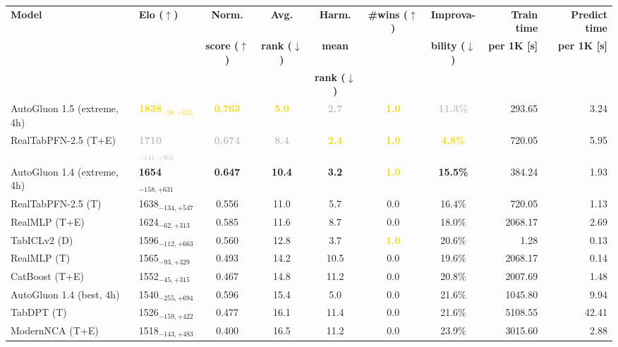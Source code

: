 \begin{tabular}{llcccccrr}
\toprule
\textbf{Model} & \textbf{Elo ($\uparrow$)} & \textbf{Norm.} & \textbf{Avg.} & \textbf{Harm.} & \textbf{\#wins ($\uparrow$)} & \textbf{Improva-} & \textbf{Train time} & \textbf{Predict time} \\
 &  & \textbf{score ($\uparrow$)} & \textbf{rank ($\downarrow$)} & \textbf{mean} &  & \textbf{bility ($\downarrow$)} & \textbf{per 1K [s]} & \textbf{per 1K [s]} \\
 &  &  &  & \textbf{rank ($\downarrow$)} &  &  &  &  \\
\midrule
AutoGluon 1.5 (extreme, 4h) & \textcolor{gold}{\textbf{1838${}_{-30,+623}$}} & \textcolor{gold}{\textbf{0.763}} & \textcolor{gold}{\textbf{5.0}} & \textcolor{silver}{\textbf{2.7}} & \textcolor{gold}{\textbf{1.0}} & \textcolor{silver}{\textbf{11.3\%}} & 293.65 & 3.24 \\
RealTabPFN-2.5 (T+E) & \textcolor{silver}{\textbf{1710${}_{-141,+903}$}} & \textcolor{silver}{\textbf{0.674}} & \textcolor{silver}{\textbf{8.4}} & \textcolor{gold}{\textbf{2.4}} & \textcolor{gold}{\textbf{1.0}} & \textcolor{gold}{\textbf{4.8\%}} & 720.05 & 5.95 \\
AutoGluon 1.4 (extreme, 4h) & \textcolor{bronze}{\textbf{1654${}_{-158,+631}$}} & \textcolor{bronze}{\textbf{0.647}} & \textcolor{bronze}{\textbf{10.4}} & \textcolor{bronze}{\textbf{3.2}} & \textcolor{gold}{\textbf{1.0}} & \textcolor{bronze}{\textbf{15.5\%}} & 384.24 & 1.93 \\
RealTabPFN-2.5 (T) & 1638${}_{-134,+547}$ & 0.556 & 11.0 & 5.7 & 0.0 & 16.4\% & 720.05 & 1.13 \\
RealMLP (T+E) & 1624${}_{-62,+313}$ & 0.585 & 11.6 & 8.7 & 0.0 & 18.0\% & 2068.17 & 2.69 \\
TabICLv2 (D) & 1596${}_{-112,+663}$ & 0.560 & 12.8 & 3.7 & \textcolor{gold}{\textbf{1.0}} & 20.6\% & 1.28 & 0.13 \\
RealMLP (T) & 1565${}_{-93,+329}$ & 0.493 & 14.2 & 10.5 & 0.0 & 19.6\% & 2068.17 & 0.14 \\
CatBoost (T+E) & 1552${}_{-45,+315}$ & 0.467 & 14.8 & 11.2 & 0.0 & 20.8\% & 2007.69 & 1.48 \\
AutoGluon 1.4 (best, 4h) & 1540${}_{-255,+694}$ & 0.596 & 15.4 & 5.0 & 0.0 & 21.6\% & 1045.80 & 9.94 \\
TabDPT (T) & 1526${}_{-159,+422}$ & 0.477 & 16.1 & 11.4 & 0.0 & 21.6\% & 5108.55 & 42.41 \\
ModernNCA (T+E) & 1518${}_{-143,+483}$ & 0.400 & 16.5 & 11.2 & 0.0 & 23.9\% & 3015.60 & 2.88 \\

\end{tabular}
